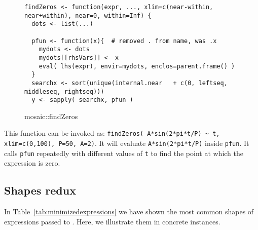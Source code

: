 \documentclass[screen,acmsmall]{acmart}%
\newcommand{\code}[1]{\lstinline |#1|\xspace}
\begin{document}
\begin{figure}[h]
\begin{lstlisting}
findZeros <- function(expr, ..., xlim=c(near-within, near+within), near=0, within=Inf) {
  dots <- list(...)

  pfun <- function(x){  # removed . from name, was .x
    mydots <- dots
    mydots[[rhsVars]] <- x
    eval( lhs(expr), envir=mydots, enclos=parent.frame() )
  }
  searchx <- sort(unique(internal.near   + c(0, leftseq, middleseq, rightseq)))
  y <- sapply( searchx, pfun )
\end{lstlisting}
  \caption{mosaic::findZeros}
\end{figure}

This function can be invoked as: \code{findZeros( A*sin(2*pi*t/P) ~ t,
  xlim=c(0,100), P=50, A=2)}. It will evaluate \code{A*sin(2*pi*t/P)} inside
\code{pfun}. It calls \code{pfun} repeatedly with different values of \code{t}
to find the point at which the expression is zero.


\subsection{Shapes redux}

In Table~\ref{tab:minimizedexpressions} we have shown the most common shapes of
expressions passed to \eval. Here, we illustrate them in concrete instances.
\end{document}
